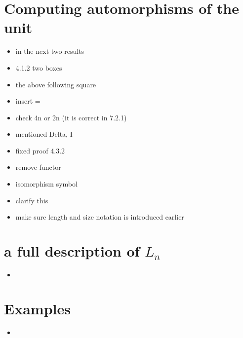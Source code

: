 \documentclass{amsart}
\begin{document}
\section{ Computing automorphisms of the unit}
\begin{itemize}
\item in the next two results
\item 4.1.2 two boxes
\item the above following square
\item insert =
\item check 4n or 2n (it is correct in 7.2.1)
\item mentioned Delta, I
\item fixed proof 4.3.2
\item remove functor


\item isomorphism symbol
\item clarify this
\item make sure length and size notation is introduced earlier
\end{itemize}

\section{a full description of $L_n $}
\begin{itemize}
\item 
\end{itemize}
\section{ Examples}
\begin{itemize}
\item 
\end{itemize}
\end{document}
